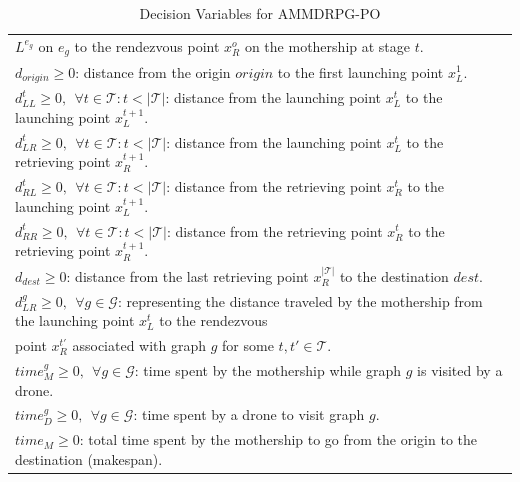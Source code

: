 \documentclass[10pt,a4paper]{elsarticle}
\begin{document}
\begin{table}[h!]
\begin{tabular}{|l|}
\hspace*{1cm} $L^{e_g}$ on $e_g$ to the rendezvous point $x_R^o$ on the mothership at stage $t$.\\
$d_{origin}\geq 0$: distance from the origin $origin$ to the first launching point $x_L^1$.\\
$d_{LL}^t\geq 0, \:\: \forall t \in \mathcal T:t<|\mathcal T|$: distance from the launching point $x_L^t$ to the launching point $x_L^{t+1}$.\\
$d_{LR}^t\geq 0, \:\: \forall t \in \mathcal T:t<|\mathcal T|$: distance from the launching point $x_L^t$ to the retrieving point $x_R^{t+1}$.\\
$d_{RL}^t\geq 0, \:\: \forall t \in \mathcal T:t<|\mathcal T|$: distance from the retrieving point $x_R^t$ to the launching point $x_L^{t+1}$.\\
$d_{RR}^t\geq 0, \:\: \forall t \in \mathcal T:t<|\mathcal T|$: distance from the retrieving point $x_R^t$ to the retrieving point $x_R^{t+1}$.\\
$d_{dest}\geq 0$: distance from the last retrieving point $x_R^{|\mathcal T|}$ to the destination $dest$.\\
$d_{LR}^g\geq 0, \:\: \forall g \in\mathcal G$: representing the distance traveled by the mothership from the launching point $x_L^t$ to the rendezvous\\
\hspace*{1cm} point $x_R^{t'}$ associated with graph $g$ for some $t, t' \in \mathcal T$.\\

$time_M^g \geq 0, \:\: \forall g \in \mathcal G$: time spent by the mothership while graph $g$ is visited by a drone.\\
$time_D^g \geq 0, \:\: \forall g \in \mathcal G$: time spent by a drone to visit graph $g$.\\  
$time_M \geq 0$: total time spent by the mothership to go from the origin to the destination (makespan).\\
\hline
\end{tabular}
\caption{Decision Variables for AMMDRPG-PO}
\label{table:t3}
\end{table}
\end{document}
